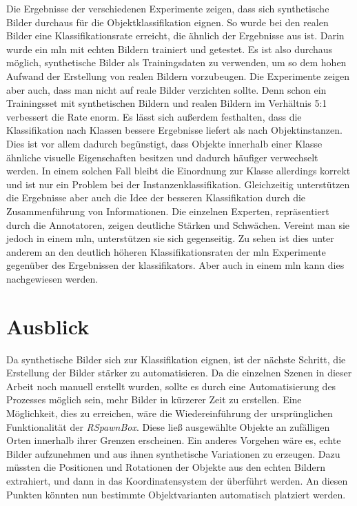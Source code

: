 Die Ergebnisse der verschiedenen Experimente zeigen, dass sich synthetische Bilder durchaus für die Objektklassifikation eignen. So wurde bei den realen Bilder eine Klassifikationsrate erreicht, die ähnlich der Ergebnisse aus \cite{pr2looking} ist. Darin wurde ein \gls{mln} mit echten Bildern trainiert und getestet. Es ist also durchaus möglich, synthetische Bilder als Trainingsdaten zu verwenden, um so dem hohen Aufwand der Erstellung von realen Bildern vorzubeugen. Die Experimente zeigen aber auch, dass man nicht auf reale Bilder verzichten sollte. Denn schon ein Trainingsset mit synthetischen Bildern und realen Bildern im Verhältnis 5:1 verbessert die Rate enorm. Es lässt sich außerdem festhalten, dass die Klassifikation nach Klassen bessere Ergebnisse liefert als nach Objektinstanzen. Dies ist vor allem dadurch begünstigt, dass Objekte innerhalb einer Klasse ähnliche visuelle Eigenschaften besitzen und dadurch häufiger verwechselt werden. In einem solchen Fall bleibt die Einordnung zur Klasse allerdings korrekt und ist nur ein Problem bei der Instanzenklassifikation.   \newline
Gleichzeitig unterstützen die Ergebnisse aber auch die Idee der besseren Klassifikation durch die Zusammenführung von Informationen. Die einzelnen Experten, repräsentiert durch die \robosherlock Annotatoren, zeigen deutliche Stärken und Schwächen. Vereint man sie jedoch in einem \gls{mln}, unterstützen sie sich gegenseitig. Zu sehen ist dies unter anderem an den deutlich höheren Klassifikationsraten der \gls{mln} Experimente gegenüber des Ergebnissen der \glspl{klassifikator}. Aber auch in einem \gls{mln} kann dies nachgewiesen werden. 

\section{Ausblick}
\label{chap:ausblick}   

Da synthetische Bilder sich zur Klassifikation eignen, ist der nächste Schritt, die Erstellung der Bilder stärker zu automatisieren. Da die einzelnen Szenen in dieser Arbeit noch manuell erstellt wurden, sollte es durch eine Automatisierung des Prozesses möglich sein, mehr Bilder in kürzerer Zeit zu erstellen. Eine Möglichkeit, dies zu erreichen, wäre die Wiedereinführung der ursprünglichen Funktionalität der \textit{RSpawnBox}. Diese ließ ausgewählte Objekte an zufälligen Orten innerhalb ihrer Grenzen erscheinen. Ein anderes Vorgehen wäre es, echte Bilder aufzunehmen und aus ihnen synthetische Variationen zu erzeugen. Dazu müssten die Positionen und Rotationen der Objekte aus den echten Bildern extrahiert, und dann in das Koordinatensystem der \unreal überführt werden. An diesen Punkten könnten nun bestimmte Objektvarianten automatisch platziert werden. \par 

